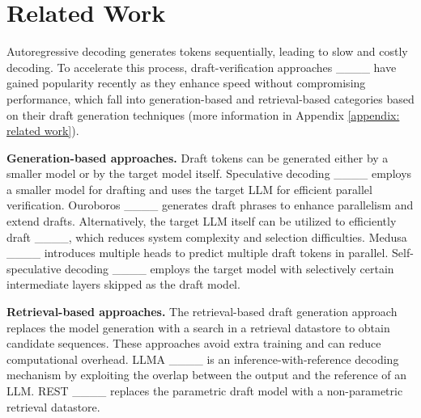 \section{Related Work}
\label{sec: related work}
Autoregressive decoding generates tokens sequentially, leading to slow and costly decoding. 
To accelerate this process, draft-verification approaches ____ have gained popularity recently as they enhance speed without compromising performance, which fall into generation-based and retrieval-based categories based on their draft generation techniques (more information in Appendix \ref{appendix: related work}).

\noindent\textbf{Generation-based approaches.}
Draft tokens can be generated either by a smaller model or by the target model itself. 
Speculative decoding ____ employs a smaller model for drafting and uses the target LLM for efficient parallel verification. Ouroboros ____ generates draft phrases to enhance parallelism and extend drafts.
Alternatively, the target LLM itself can be utilized to efficiently draft ____, which reduces system complexity and selection difficulties.
Medusa ____ introduces multiple heads to predict multiple draft tokens in parallel.
Self-speculative decoding ____ employs the target model with selectively certain intermediate layers skipped as the draft model.


\noindent\textbf{Retrieval-based approaches.}
The retrieval-based draft generation approach replaces the model generation with a search in a retrieval datastore to obtain candidate sequences. These approaches avoid extra training and can reduce computational overhead.
LLMA ____ is an inference-with-reference decoding mechanism by exploiting the overlap between the output and the reference of an LLM.
REST ____ replaces the parametric draft model with a non-parametric retrieval datastore.